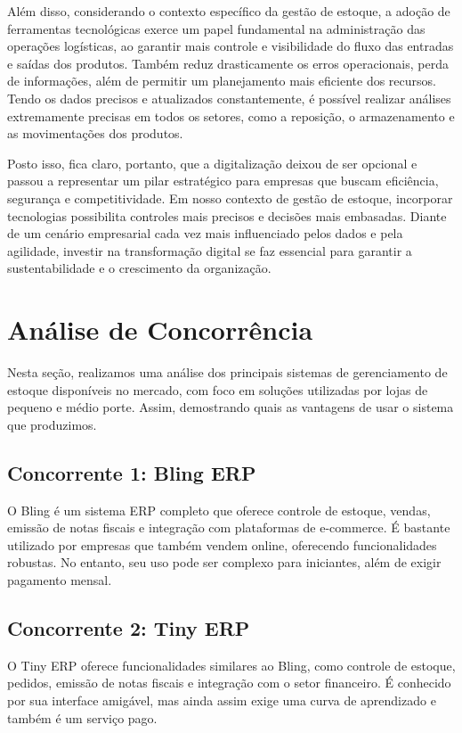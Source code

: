 \documentclass[
	12pt,				%
	openany,			%
	twoside,			%
	a4paper,			%
	english,			%
	brazil				%
	]{abntex2}
\begin{document}
Além disso, considerando o contexto específico da gestão de estoque, a adoção de ferramentas tecnológicas exerce um papel fundamental na administração das operações logísticas, ao garantir mais controle e visibilidade do fluxo das entradas e saídas dos produtos. Também reduz drasticamente os erros operacionais, perda de informações, além de permitir um planejamento mais eficiente dos recursos. Tendo os dados precisos e atualizados constantemente, é possível realizar análises extremamente precisas em todos os setores, como a reposição, o armazenamento e as movimentações dos produtos.

Posto isso, fica claro, portanto, que a digitalização deixou de ser opcional e passou a representar um pilar estratégico para empresas que buscam eficiência, segurança e competitividade. Em nosso contexto de gestão de estoque, incorporar tecnologias possibilita controles mais precisos e decisões mais embasadas. Diante de um cenário empresarial cada vez mais influenciado pelos dados e pela agilidade, investir na transformação digital se faz essencial para garantir a sustentabilidade e o crescimento da organização.

\section{Análise de Concorrência}

Nesta seção, realizamos uma análise dos principais sistemas de gerenciamento de estoque disponíveis no mercado, com foco em soluções utilizadas por lojas de pequeno e médio porte. Assim, demostrando quais as vantagens de usar o sistema que produzimos.

\subsection{Concorrente 1: Bling ERP}
O Bling é um sistema ERP completo que oferece controle de estoque, vendas, emissão de notas fiscais e integração com plataformas de e-commerce. É bastante utilizado por empresas que também vendem online, oferecendo funcionalidades robustas. No entanto, seu uso pode ser complexo para iniciantes, além de exigir pagamento mensal.

\subsection{Concorrente 2: Tiny ERP}
O Tiny ERP oferece funcionalidades similares ao Bling, como controle de estoque, pedidos, emissão de notas fiscais e integração com o setor financeiro. É conhecido por sua interface amigável, mas ainda assim exige uma curva de aprendizado e também é um serviço pago.
\end{document}
